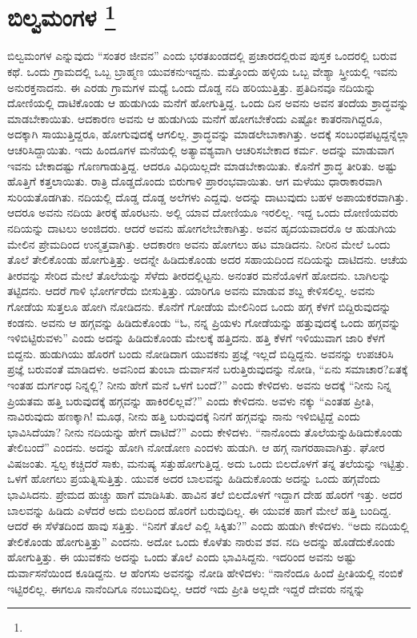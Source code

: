 
\chapter[ಬಿಲ್ವಮಂಗಳ ]{ಬಿಲ್ವಮಂಗಳ \protect\footnote{}}

ಬಿಲ್ವಮಂಗಳ ಎನ್ನುವುದು “ಸಂತರ ಜೀವನ” ಎಂದು ಭರತಖಂಡದಲ್ಲಿ ಪ್ರಚಾರದಲ್ಲಿರುವ ಪುಸ್ತಕ ಒಂದರಲ್ಲಿ ಬರುವ ಕಥೆ. ಒಂದು ಗ್ರಾಮದಲ್ಲಿ ಒಬ್ಬ ಬ್ರಾಹ್ಮಣ ಯುವಕನು\break ಇದ್ದನು. ಮತ್ತೊಂದು ಹಳ್ಳಿಯ ಒಬ್ಬ ವೇಶ್ಯಾ ಸ್ತ್ರೀಯಲ್ಲಿ ಇವನು ಅನುರಕ್ತನಾದನು. ಈ ಎರಡು ಗ್ರಾಮಗಳ ಮಧ್ಯೆ ಒಂದು ದೊಡ್ಡ ನದಿ ಹರಿಯುತ್ತಿತ್ತು. ಪ್ರತಿದಿನವೂ ನದಿಯನ್ನು ದೋಣಿಯಲ್ಲಿ ದಾಟಿಕೊಂಡು ಆ ಹುಡುಗಿಯ ಮನೆಗೆ ಹೋಗುತ್ತಿದ್ದ. ಒಂದು ದಿನ ಅವನು ಅವನ ತಂದೆಯ ಶ್ರಾದ್ಧವನ್ನು ಮಾಡಬೇಕಾಯಿತು. ಆದಕಾರಣ ಅವನು ಆ ಹುಡುಗಿಯ ಮನೆಗೆ ಹೋಗಬೇಕೆಂದು ಎಷ್ಟೋ ಕಾತರನಾಗಿದ್ದರೂ, ಅದಕ್ಕಾಗಿ ಸಾಯುತ್ತಿದ್ದರೂ, ಹೋಗುವುದಕ್ಕೆ ಆಗಲಿಲ್ಲ. ಶ್ರಾದ್ಧವನ್ನು ಮಾಡಲೇಬಾಕಾಗಿತ್ತು. ಅದಕ್ಕೆ ಸಂಬಂಧಪಟ್ಟದ್ದನ್ನೆಲ್ಲಾ ಆಚರಿಸಿದ್ದಾಯಿತು. ಇದು ಹಿಂದೂಗಳ ಮನೆಯಲ್ಲಿ ಅತ್ಯಾವಶ್ಯವಾಗಿ ಆಚರಿಸಬೇಕಾದ ಕರ್ಮ. ಅದನ್ನು ಮಾಡುವಾಗ ಇವನು ಬೇಕಾದಷ್ಟು ಗೊಣಗಾಡು\-ತ್ತಿದ್ದ. ಆದರೂ ವಿಧಿಯಿಲ್ಲದೇ ಮಾಡಬೇಕಾಯಿತು. ಕೊನೆಗೆ ಶ್ರಾದ್ಧ ತೀರಿತು. ಅಷ್ಟು ಹೊತ್ತಿಗೆ ಕತ್ತಲಾಯಿತು. ರಾತ್ರಿ ದೊಡ್ಡದೊಂದು ಬಿರುಗಾಳಿ ಪ್ರಾರಂಭವಾಯಿತು. ಆಗ ಮಳೆಯು ಧಾರಾಕಾರವಾಗಿ ಸುರಿಯತೊಡಗಿತು. ನದಿಯಲ್ಲಿ ದೊಡ್ಡ ದೊಡ್ಡ ಅಲೆಗಳು ಎದ್ದವು. ಅದನ್ನು ದಾಟುವುದು ಬಹಳ ಅಪಾಯಕರವಾಗಿತ್ತು. ಆದರೂ ಅವನು ನದಿಯ ತೀರಕ್ಕೆ ಹೊರಟನು. ಅಲ್ಲಿ ಯಾವ ದೋಣಿಯೂ ಇರಲಿಲ್ಲ. ಇದ್ದ ಒಂದು ದೋಣಿಯವರು ನದಿಯನ್ನು ದಾಟಲು ಅಂಜಿದರು. ಆದರೆ ಅವನು ಹೋಗಲೇಬೇಕಾಗಿತ್ತು. ಅವನ ಹೃದಯವಾದರೊ ಆ ಹುಡುಗಿಯ ಮೇಲಿನ ಪ್ರೇಮದಿಂದ ಉನ್ಮತ್ತವಾಗಿತ್ತು. ಆದಕಾರಣ ಅವನು ಹೋಗಲು ಹಟ ಮಾಡಿದನು. ನೀರಿನ ಮೇಲೆ ಒಂದು ತೊಲೆ ತೇಲಿಕೊಂಡು ಹೋಗುತ್ತಿತ್ತು. ಅದನ್ನೇ ಹಿಡಿದುಕೊಂಡು ಅದರ ಸಹಾಯದಿಂದ ನದಿಯನ್ನು ದಾಟಿದನು. ಆಚೆಯ ತೀರವನ್ನು ಸೇರಿದ ಮೇಲೆ ತೊಲೆಯನ್ನು ಸೆಳೆದು ತೀರದಲ್ಲಿಟ್ಟನು. ಅನಂತರ ಮನೆಯೊಳಗೆ ಹೋದನು. ಬಾಗಿಲನ್ನು ತಟ್ಟಿದನು. ಆದರೆ ಗಾಳಿ ಭೋರ್ಗರೆದು ಬೀಸುತ್ತಿತ್ತು. ಯಾರಿಗೂ ಅವನು ಮಾಡುವ ಶಬ್ದ ಕೇಳಿಸಲಿಲ್ಲ. ಅವನು ಗೋಡೆಯ ಸುತ್ತಲೂ ಹೋಗಿ ನೋಡಿದನು. ಕೊನೆಗೆ ಗೋಡೆಯ ಮೇಲಿನಿಂದ ಒಂದು ಹಗ್ಗ ಕೆಳಗೆ ಬಿದ್ದಿರುವುದನ್ನು ಕಂಡನು. ಅವನು ಆ ಹಗ್ಗವನ್ನು ಹಿಡಿದುಕೊಂಡು “ಓ, ನನ್ನ ಪ್ರಿಯಳು ಗೋಡೆಯನ್ನು ಹತ್ತುವುದಕ್ಕೆ ಒಂದು ಹಗ್ಗವನ್ನು ಇಳಿಬಿಟ್ಟಿರುವಳು” ಎಂದು ಅದನ್ನು ಹಿಡಿದುಕೊಂಡು ಮೇಲಕ್ಕೆ ಹತ್ತಿದನು. ಹತ್ತಿ ಕೆಳಗೆ ಇಳಿಯು\-ವಾಗ ಜಾರಿ ಕೆಳಗೆ ಬಿದ್ದನು. ಹುಡುಗಿಯು ಹೊರಗೆ ಬಂದು ನೋಡಿದಾಗ ಯುವಕನು ಪ್ರಜ್ಞೆ ಇಲ್ಲದೆ ಬಿದ್ದಿದ್ದನು. ಅವನನ್ನು ಉಪಚರಿಸಿ ಪ್ರಜ್ಞೆ ಬರುವಂತೆ ಮಾಡಿದಳು. ಅವನಿಂದ ತುಂಬಾ ದುರ್ವಾಸನೆ ಬರುತ್ತಿರುವುದನ್ನು ನೋಡಿ, “ಏನು ಸಮಾಚಾರ?\break ಏತಕ್ಕೆ ಇಂತಹ ದುರ್ಗಂಧ ನಿನ್ನಲ್ಲಿ? ನೀನು ಹೇಗೆ ಮನೆ ಒಳಗೆ ಬಂದೆ?” ಎಂದು ಕೇಳಿದಳು. ಅವನು ಅದಕ್ಕೆ “ನೀನು ನಿನ್ನ ಪ್ರಿಯತಮ ಹತ್ತಿ ಬರುವುದಕ್ಕೆ ಹಗ್ಗವನ್ನು ಹಾಕಿರಲಿಲ್ಲವೆ?” ಎಂದು ಕೇಳಿದನು. ಅವಳು ನಕ್ಕು “ಎಂತಹ ಪ್ರೀತಿ, ನಾವಿರುವುದು ಹಣಕ್ಕಾಗಿ! ಮೂಢ, ನೀನು ಹತ್ತಿ ಬರುವುದಕ್ಕೆ ನಿನಗೆ ಹಗ್ಗವನ್ನು ನಾನು ಇಳಿಬಿಟ್ಟಿದ್ದೆ ಎಂದು ಭಾವಿಸಿದೆಯಾ? ನೀನು ನದಿಯನ್ನು ಹೇಗೆ ದಾಟಿದೆ?” ಎಂದು ಕೇಳಿದಳು. “ನಾನೊಂದು ತೊಲೆಯನ್ನು\break ಹಿಡಿದುಕೊಂಡು ತೇಲಿಬಂದೆ” ಎಂದನು. ಅದನ್ನು ಹೋಗಿ ನೋಡೋಣ ಎಂದಳು ಹುಡುಗಿ. ಆ ಹಗ್ಗ ನಾಗರಹಾವಾಗಿತ್ತು. ಘೋರ ವಿಷಜಂತು. ಸ್ವಲ್ಪ ಕಚ್ಚಿದರೆ ಸಾಕು, ಮನುಷ್ಯ ಸತ್ತುಹೋಗುತ್ತಿದ್ದ. ಅದು ಒಂದು ಬಿಲದೊಳಗೆ ತನ್ನ ತಲೆಯನ್ನು ಇಟ್ಟಿತ್ತು. ಒಳಗೆ ಹೋಗಲು ಪ್ರಯತ್ನಿಸುತ್ತಿತ್ತು. ಯುವಕ ಅದರ ಬಾಲವನ್ನು ಹಿಡಿದುಕೊಂಡು ಅದನ್ನು ಒಂದು ಹಗ್ಗವೆಂದು ಭಾವಿಸಿದನು. ಪ್ರೇಮದ ಹುಚ್ಚು ಹಾಗೆ ಮಾಡಿಸಿತು. ಹಾವಿನ ತಲೆ ಬಿಲದೊಳಗೆ ಇದ್ದಾಗ ದೇಹ ಹೊರಗೆ ಇತ್ತು. ಅದರ ಬಾಲವನ್ನು ಹಿಡಿದು ಎಳೆದರೆ ಅದು ಬಿಲದಿಂದ ಹೊರಗೆ ಬರುವುದಿಲ್ಲ. ಈ ಯುವಕ ಹಾಗೆ ಮೇಲೆ ಹತ್ತಿ ಬಂದಿದ್ದ. ಆದರೆ ಈ ಸೆಳೆತದಿಂದ ಹಾವು ಸತ್ತಿತ್ತು. “ನಿನಗೆ ತೊಲೆ ಎಲ್ಲಿ ಸಿಕ್ಕಿತು?” ಎಂದು ಹುಡುಗಿ ಕೇಳಿದಳು. “ಅದು ನದಿಯಲ್ಲಿ ತೇಲಿಕೊಂಡು ಹೋಗುತ್ತಿತ್ತು” ಎಂದನು. ಅದೋ ಒಂದು ಕೊಳೆತು ನಾರುವ ಶವ. ನದಿ ಅದನ್ನು ಹೊಡೆದುಕೊಂಡು ಹೋಗುತ್ತಿತ್ತು. ಈ ಯುವಕನು ಅದನ್ನು ಒಂದು ತೊಲೆ ಎಂದು ಭಾವಿಸಿದ್ದನು. ಇದರಿಂದ ಅವನು ಅಷ್ಟು ದುರ್ವಾಸನೆಯಿಂದ ಕೂಡಿದ್ದನು. ಆ ಹೆಂಗಸು ಅವನನ್ನು ನೋಡಿ ಹೇಳಿದಳು: “ನಾನೆಂದೂ ಹಿಂದೆ ಪ್ರೀತಿಯಲ್ಲಿ ನಂಬಿಕೆ ಇಟ್ಟಿರಲಿಲ್ಲ. ಈಗಲೂ ನಾನೆಂದಿಗೂ ನಂಬುವುದಿಲ್ಲ. ಆದರೆ ಇದು ಪ್ರೀತಿ ಅಲ್ಲದೇ ಇದ್ದರೆ ದೇವರು ನನ್ನನ್ನು 
